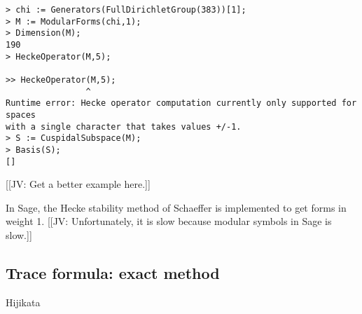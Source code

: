 \documentclass[11pt]{amsart}
\numberwithin{equation}{subsection}
\theoremstyle{plain}
\theoremstyle{definition}
\newcommand{\jv}[1]{{\color{red} \textsf{[[JV: #1]]}}}
\begin{document}
\begin{verbatim}
> chi := Generators(FullDirichletGroup(383))[1];
> M := ModularForms(chi,1);
> Dimension(M);
190
> HeckeOperator(M,5);

>> HeckeOperator(M,5);
                ^
Runtime error: Hecke operator computation currently only supported for spaces 
with a single character that takes values +/-1.
> S := CuspidalSubspace(M);
> Basis(S);
[]
\end{verbatim}

\jv{Get a better example here.}

In Sage, the Hecke stability method of Schaeffer \cite{Schaeffer} is implemented to get forms in weight 1.  \jv{Unfortunately, it is slow because modular symbols in Sage is slow.}

\subsection{Trace formula: exact method}

Hijikata
\end{document}
